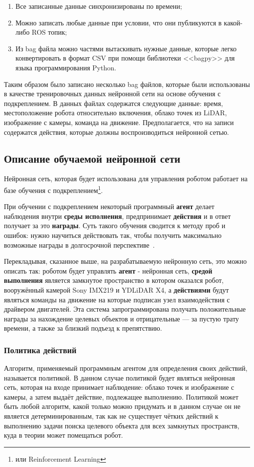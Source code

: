 \begin{enumerate}[beginpenalty=10000] %
  \item Все записанные данные синхронизированы по времени;
  \item Можно записать любые данные при условии, что они публикуются в какой-либо ROS топик; 
  \item Из bag файла можно частями вытаскивать нужные данные, которые легко конвертировать в формат CSV при помощи библиотеки <<bagpy>> для языка программирования Python.
\end{enumerate}

Таким образом было записано несколько bag файлов, которые были использованы в качестве тренировочных данных нейронной сети на основе обучения с подкреплением. В данных файлах содержатся следующие данные: время, местоположение робота относительно включения, облако точек из LiDAR, изображение с камеры, команда на движение. Предполагается, что на записи содержатся действия, которые должны воспроизводиться нейронной сетью. 

\subsection{Описание обучаемой нейронной сети}
Нейронная сеть, которая будет использована для управления роботом работает на базе обучения с подкреплением\footnote{или Reinforcement Learning}. 

При обучении с подкреплением некоторый программный \textbf{агент} делает наблюдения внутри \textbf{среды исполнения}, предпринимает \textbf{действия} и в ответ получает за это \textbf{награды}. Суть такого обучения сводится к методу проб и ошибок: нужно научиться действовать так, чтобы получить максимально возможные награды в долгосрочной перспективе~\cite{reinforcement}. 

Перекладывая, сказанное выше, на разрабатываемую нейронную сеть, это можно описать так: роботом будет управлять \textbf{агент} - нейронная сеть, \textbf{средой выполнения} является замкнутое пространство в котором оказался робот, вооружённый камерой Sony IMX219 и YDLiDAR X4, а \textbf{действиями} будут являться команды на движение на которые подписан узел взаимодействия с драйвером двигателей. Эта система запрограммирована получать положительные награды за нахождение целевых объектов и отрицательные --- за пустую трату времени, а также за близкий подъезд к препятствию.

\subsubsection{Политика действий}
Алгоритм, применяемый программным агентом для определения своих действий, называется политикой. В данном случае политикой будет являться нейронная сеть, которая на входе принимает наблюдение: облако точек и изображение с камеры, а затем выдаёт действие, подлежащее выполнению. Политикой может быть любой алгоритм, какой только можно придумать и в данном случае он не является детерминированным, так как не существует чётких действий к выполнению задачи поиска целевого объекта для всех замкнутых пространств, куда в теории может помещаться робот. 

